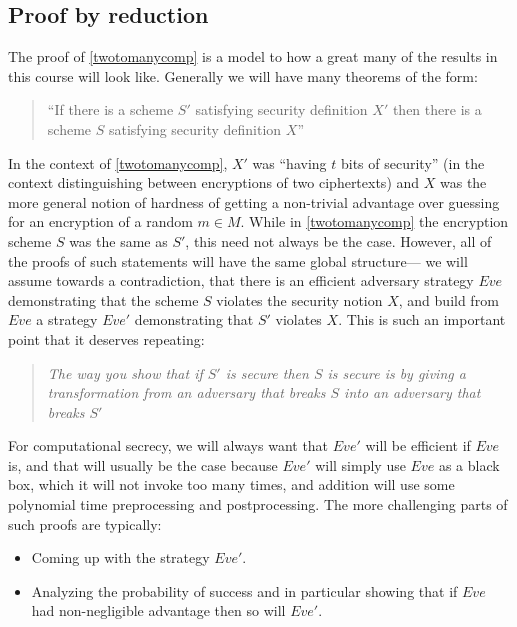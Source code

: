\subsection{Proof by reduction}\label{Proof-by-reduction}

The proof of \cref{twotomanycomp} is a model to how a great many of the
results in this course will look like. Generally we will have many
theorems of the form:

\begin{quote}
``If there is a scheme \(S'\) satisfying security definition \(X'\) then
there is a scheme \(S\) satisfying security definition \(X\)''
\end{quote}

In the context of \cref{twotomanycomp}, \(X'\) was ``having \(t\) bits
of security'' (in the context distinguishing between encryptions of two
ciphertexts) and \(X\) was the more general notion of hardness of
getting a non-trivial advantage over guessing for an encryption of a
random \(m\in M\). While in \cref{twotomanycomp} the encryption scheme
\(S\) was the same as \(S'\), this need not always be the case. However,
all of the proofs of such statements will have the same global
structure--- we will assume towards a contradiction, that there is an
efficient adversary strategy \(Eve\) demonstrating that the scheme \(S\)
violates the security notion \(X\), and build from \(Eve\) a strategy
\(Eve'\) demonstrating that \(S'\) violates \(X\). This is such an
important point that it deserves repeating:

\begin{quote}
\emph{The way you show that if \(S'\) is secure then \(S\) is secure is
by giving a transformation from an adversary that breaks \(S\) into an
adversary that breaks \(S'\)}
\end{quote}

For computational secrecy, we will always want that \(Eve'\) will be
efficient if \(Eve\) is, and that will usually be the case because
\(Eve'\) will simply use \(Eve\) as a black box, which it will not
invoke too many times, and addition will use some polynomial time
preprocessing and postprocessing. The more challenging parts of such
proofs are typically:

\begin{itemize}
\item
  Coming up with the strategy \(Eve'\).
\item
  Analyzing the probability of success and in particular showing that if
  \(Eve\) had non-negligible advantage then so will \(Eve'\).
\end{itemize}


